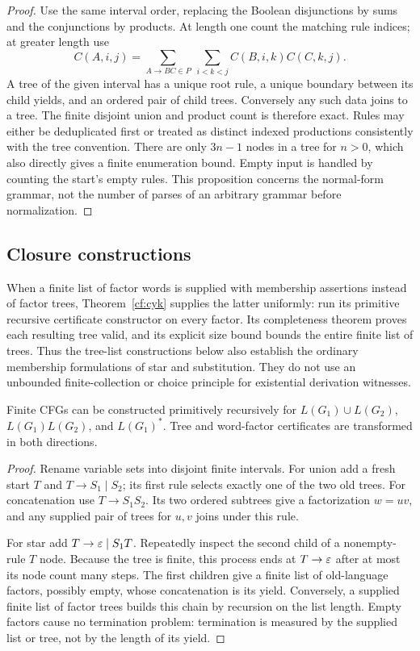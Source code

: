 \begin{proof}
Use the same interval order, replacing the Boolean disjunctions by sums and
the conjunctions by products.  At length one count the matching rule
indices; at greater length use
\[
 C(A,i,j)=\sum_{A\to BC\in P}\ \sum_{i<k<j}
                  C(B,i,k)C(C,k,j).
\]
A tree of the given interval has a unique root rule, a unique boundary
between its child yields, and an ordered pair of child trees.  Conversely
any such data joins to a tree.  The finite disjoint union and product count
is therefore exact.  Rules may either be deduplicated first or treated as
distinct indexed productions consistently with the tree convention.
There are only $3n-1$ nodes in a tree for $n>0$, which also directly gives
a finite enumeration bound.  Empty input is handled by counting the
start's empty rules.  This proposition concerns the normal-form grammar,
not the number of parses of an arbitrary grammar before normalization.
\end{proof}

\subsection{Closure constructions}

When a finite list of factor words is supplied with membership assertions
instead of factor trees, Theorem~\ref{cf:cyk} supplies the latter uniformly:
run its primitive recursive certificate constructor on every factor.
Its completeness theorem proves each resulting tree valid, and its
explicit size bound bounds the entire finite list of trees.  Thus the
tree-list constructions below also establish the ordinary membership
formulations of star and substitution.  They do not use an unbounded
finite-collection or choice principle for existential derivation witnesses.

\begin{theorem}
\label{cf:basic-closure}
Finite CFGs can be constructed primitively recursively for
$L(G_1)\cup L(G_2)$, $L(G_1)L(G_2)$, and $L(G_1)^*$.  Tree and word-factor
certificates are transformed in both directions.
\end{theorem}

\begin{proof}
Rename variable sets into disjoint finite intervals.  For union add a fresh
start $T$ and $T\to S_1\mid S_2$; its first rule selects exactly one of the
two old trees.  For concatenation use $T\to S_1S_2$.  Its two ordered subtrees
give a factorization $w=uv$, and any supplied pair of trees for $u,v$ joins
under this rule.

For star add $T\to\varepsilon\mid S_1T$.  Repeatedly inspect the second child of a
nonempty-rule $T$ node.  Because the tree is finite, this process ends at
$T\to\varepsilon$ after at most its node count many steps.  The first children give
a finite list of old-language factors, possibly empty, whose concatenation
is its yield.  Conversely, a supplied finite list of factor trees builds
this chain by recursion on the list length.  Empty factors cause no
termination problem: termination is measured by the supplied list or tree,
not by the length of its yield.
\end{proof}

